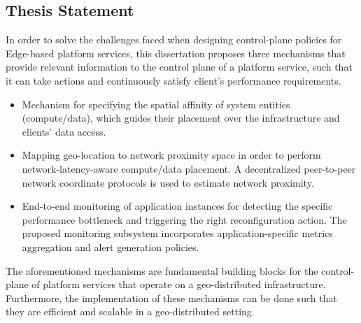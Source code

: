 \subsection{Thesis Statement}
In order to solve the challenges faced when designing control-plane policies for Edge-based platform services, this dissertation proposes three mechanisms that provide relevant information to the control plane of a platform service, such that it can take actions and continuously satisfy client's performance requirements.
\begin{itemize}
\item Mechanism for specifying the spatial affinity of system entities (compute/data), which guides their placement over the infrastructure and clients' data access. 
\item Mapping geo-location to network proximity space in order to perform network-latency-aware compute/data placement. A decentralized peer-to-peer network coordinate protocols is used to estimate network proximity.
\item End-to-end monitoring of application instances for detecting the specific performance bottleneck and triggering the right reconfiguration action. The proposed monitoring subsystem incorporates application-specific metrics aggregation and alert generation policies. 
\end{itemize}

The aforementioned mechanisms are fundamental building blocks for the control-plane of platform services that operate on a geo-distributed infrastructure. Furthermore, the implementation of these mechanisms can be done such that they are efficient and scalable in a geo-distributed setting.

